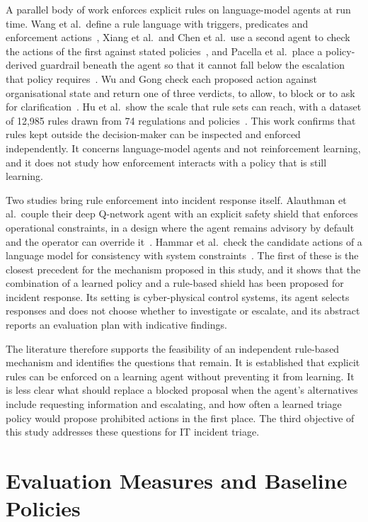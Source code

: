 \documentclass[12pt,a4paper]{article}
\begin{document}
A parallel body of work enforces explicit rules on language-model agents at run time. Wang et al.\ define a rule language with triggers, predicates and enforcement actions~\cite{wang2025agentspec}, Xiang et al.\ and Chen et al.\ use a second agent to check the actions of the first against stated policies~\cite{xiang2025,chen2025shieldagent}, and Pacella et al.\ place a policy-derived guardrail beneath the agent so that it cannot fall below the escalation that policy requires~\cite{pacella2026}. Wu and Gong check each proposed action against organisational state and return one of three verdicts, to allow, to block or to ask for clarification~\cite{wu2026}. Hu et al.\ show the scale that rule sets can reach, with a dataset of 12,985 rules drawn from 74 regulations and policies~\cite{hu2026}. This work confirms that rules kept outside the decision-maker can be inspected and enforced independently. It concerns language-model agents and not reinforcement learning, and it does not study how enforcement interacts with a policy that is still learning.

Two studies bring rule enforcement into incident response itself. Alauthman et al.\ couple their deep Q-network agent with an explicit safety shield that enforces operational constraints, in a design where the agent remains advisory by default and the operator can override it~\cite{alauthman2026}. Hammar et al.\ check the candidate actions of a language model for consistency with system constraints~\cite{hammar2026llm}. The first of these is the closest precedent for the mechanism proposed in this study, and it shows that the combination of a learned policy and a rule-based shield has been proposed for incident response. Its setting is cyber-physical control systems, its agent selects responses and does not choose whether to investigate or escalate, and its abstract reports an evaluation plan with indicative findings.

The literature therefore supports the feasibility of an independent rule-based mechanism and identifies the questions that remain. It is established that explicit rules can be enforced on a learning agent without preventing it from learning. It is less clear what should replace a blocked proposal when the agent's alternatives include requesting information and escalating, and how often a learned triage policy would propose prohibited actions in the first place. The third objective of this study addresses these questions for IT incident triage.

\section{Evaluation Measures and Baseline Policies}
\end{document}
